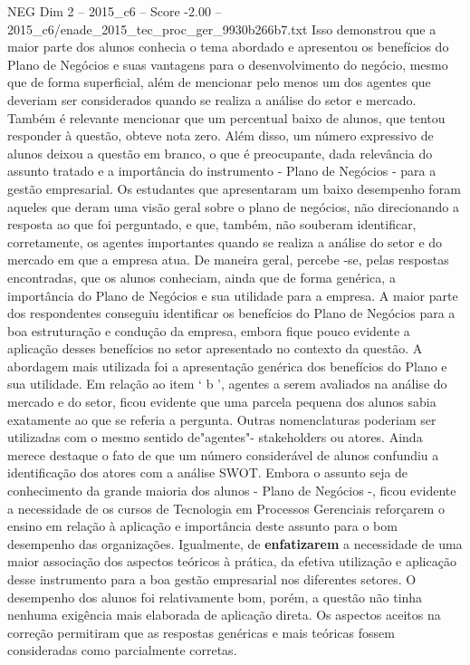 \begin{textsample}{NEG Dim 2 – 2015\_c6 – Score -2.00 – 2015\_c6/enade\_2015\_tec\_proc\_ger\_9930b266b7.txt}
Isso demonstrou que a maior parte dos alunos conhecia o tema abordado e apresentou os benefícios do Plano de Negócios e suas vantagens para o desenvolvimento do negócio, mesmo que de forma superficial, além de mencionar pelo menos um dos agentes que deveriam ser considerados quando se realiza a análise do setor e mercado.
Também é relevante mencionar que um percentual baixo de alunos, que tentou responder à questão, obteve nota zero.
Além disso, um número expressivo de alunos deixou a questão em branco, o que é preocupante, dada relevância do assunto tratado e a importância do instrumento - Plano de Negócios - para a gestão empresarial.
Os estudantes que apresentaram um baixo desempenho foram aqueles que deram uma visão geral sobre o plano de negócios, não direcionando a resposta ao que foi perguntado, e que, também, não souberam identificar, corretamente, os agentes importantes quando se realiza a análise do setor e do mercado em que a empresa atua.
De maneira geral, percebe -se, pelas respostas encontradas, que os alunos conheciam, ainda que de forma genérica, a importância do Plano de Negócios e sua utilidade para a empresa.
A maior parte dos respondentes conseguiu identificar os benefícios do Plano de Negócios para a boa estruturação e condução da empresa, embora fique pouco evidente a aplicação desses benefícios no setor apresentado no contexto da questão.
A abordagem mais utilizada foi a apresentação genérica dos benefícios do Plano e sua utilidade.
Em relação ao item ‘ b ’, agentes a serem avaliados na análise do mercado e do setor, ficou evidente que uma parcela pequena dos alunos sabia exatamente ao que se referia a pergunta.
Outras nomenclaturas poderiam ser utilizadas com o mesmo sentido de"agentes"- stakeholders ou atores.
Ainda merece destaque o fato de que um número considerável de alunos confundiu a identificação dos atores com a análise SWOT.
Embora o assunto seja de conhecimento da grande maioria dos alunos - Plano de Negócios -, ficou evidente a necessidade de os cursos de Tecnologia em Processos Gerenciais reforçarem o ensino em relação à aplicação e importância deste assunto para o bom desempenho das organizações.
Igualmente, de \textbf{enfatizarem} a necessidade de uma maior associação dos aspectos teóricos à prática, da efetiva utilização e aplicação desse instrumento para a boa gestão empresarial nos diferentes setores.
O desempenho dos alunos foi relativamente bom, porém, a questão não tinha nenhuma exigência mais elaborada de aplicação direta.
Os aspectos aceitos na correção permitiram que as respostas genéricas e mais teóricas fossem consideradas como parcialmente corretas.

\end{textsample}
